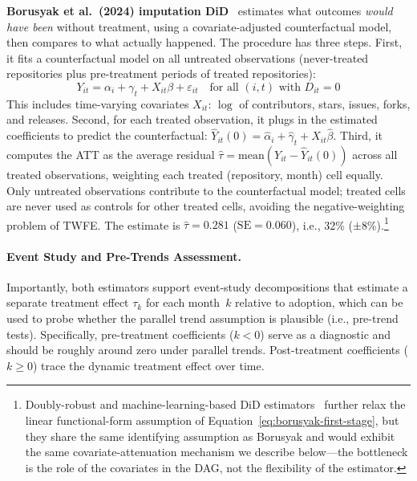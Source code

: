 \textbf{Borusyak et al.\ (2024) imputation DiD}~\cite{borusyak2024revisiting} estimates what outcomes \emph{would have been} without treatment, using a covariate-adjusted counterfactual model, then compares to what actually happened.
The procedure has three steps.
First, it fits a counterfactual model on all untreated observations (never-treated repositories plus pre-treatment periods of treated repositories):
\begin{equation}
\label{eq:borusyak-first-stage}
Y_{it} = \alpha_i + \gamma_t + X_{it}\beta + \varepsilon_{it} \quad \text{for all } (i,t) \text{ with } D_{it} = 0
\end{equation}
This includes time-varying covariates $X_{it}$: $\log$ of contributors, stars, issues, forks, and releases.
Second, for each treated observation, it plugs in the estimated coefficients to predict the counterfactual: $\hat{Y}_{it}(0) = \hat{\alpha}_i + \hat{\gamma}_t + X_{it}\hat{\beta}$.
Third, it computes the ATT as the average residual $\hat{\tau} = \text{mean}(Y_{it} - \hat{Y}_{it}(0))$ across all treated observations, weighting each treated (repository, month) cell equally.
Only untreated observations contribute to the counterfactual model; treated cells are never used as controls for other treated cells, avoiding the negative-weighting problem of TWFE\@.
The estimate is $\hat{\tau} = 0.281$ ($\text{SE} = 0.060$), i.e., 32\% ($\pm$8\%).\footnote{Doubly-robust and machine-learning-based DiD estimators~\cite{santanna2020doubly, chang2020double} further relax the linear functional-form assumption of Equation~\ref{eq:borusyak-first-stage}, but they share the same identifying assumption as Borusyak and would exhibit the same covariate-attenuation mechanism we describe below---the bottleneck is the role of the covariates in the DAG, not the flexibility of the estimator.}

\paragraph{Event Study and Pre-Trends Assessment.}
\label{sec:event-study}
Importantly, both estimators support event-study decompositions that estimate a separate treatment effect $\tau_k$ for each month~$k$ relative to adoption, which can be used to probe whether the parallel trend assumption is plausible (i.e., pre-trend tests).
Specifically, pre-treatment coefficients ($k < 0$) serve as a diagnostic and should be roughly around zero under parallel trends.
Post-treatment coefficients ($k \geq 0$) trace the dynamic treatment effect over time.

